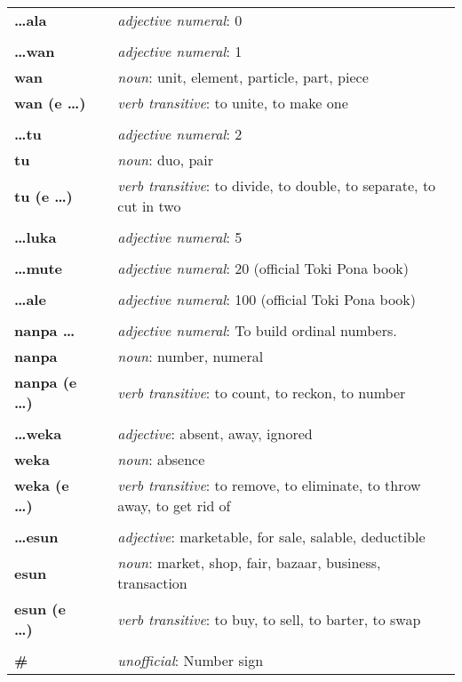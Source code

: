 \begin{supertabular}{p{2,5cm}|ll}
\textbf{\dots ala} && \textit{adjective numeral}: 0 \\ %
 && \\ %
\textbf{\dots wan} && \textit{adjective numeral}: 1 \\ %
\textbf{wan} && \textit{noun}: unit, element, particle, part, piece \\ %
\textbf{wan (e \dots)} && \textit{verb transitive}: to unite, to make one \\ %
 && \\ %
\textbf{\dots tu} && \textit{adjective numeral}: 2 \\ %
\textbf{tu} && \textit{noun}: duo, pair \\ %
\textbf{tu (e \dots)} && \textit{verb transitive}: to divide, to double, to separate, to cut in two \\ %
 && \\ %
\textbf{\dots luka} && \textit{adjective numeral}: 5 \\ %
 && \\ %
\textbf{\dots mute} && \textit{adjective numeral}: 20 (official Toki Pona book) \\ %
 && \\ %
\textbf{\dots ale} && \textit{adjective numeral}: 100 (official Toki Pona book) \\ %
 && \\ %
\textbf{nanpa \dots} && \textit{adjective numeral}: To build ordinal numbers. \\ %
\textbf{nanpa} && \textit{noun}: number, numeral \\ %
\textbf{nanpa (e \dots)} && \textit{verb transitive}: to count, to reckon,  to number \\ %
 && \\ %
\textbf{\dots weka} && \textit{adjective}: absent, away, ignored \\ %
\textbf{weka} && \textit{noun}: absence \\ %
\textbf{weka (e \dots)} && \textit{verb transitive}: to remove, to eliminate, to throw away, to get rid of \\ %
 && \\ %
\textbf{\dots esun} && \textit{adjective}: marketable, for sale, salable, deductible \\  %
\textbf{esun} && \textit{noun}: market, shop, fair, bazaar, business, transaction \\ %
\textbf{esun (e \dots)} && \textit{verb transitive}: to buy, to sell, to barter, to swap \\ %
 && \\ %
\textbf{\#} && \textit{unofficial}: Number sign  \\ %
\end{supertabular} \\
%
